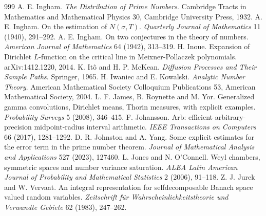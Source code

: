 \begin{thebibliography}{999}
 A. E. Ingham. \emph{The Distribution of Prime Numbers}. Cambridge Tracts in Mathematics and Mathematical Physics 30, Cambridge University Press, 1932.
 A. E. Ingham. On the estimation of $N(\sigma,T)$. \emph{Quarterly Journal of Mathematics} 11 (1940), 291--292.
 A. E. Ingham. On two conjectures in the theory of numbers. \emph{American Journal of Mathematics} 64 (1942), 313--319.
 H. Inoue. Expansion of Dirichlet $L$-function on the critical line in Meixner-Pollaczek polynomials. arXiv:1412.1220, 2014.
 K. It\^o and H. P. McKean. \emph{Diffusion Processes and Their Sample Paths}. Springer, 1965.
 H. Iwaniec and E. Kowalski. \emph{Analytic Number Theory}. American Mathematical Society Colloquium Publications 53, American Mathematical Society, 2004.
 L. F. James, B. Roynette and M. Yor. Generalized gamma convolutions, Dirichlet means, Thorin measures, with explicit examples. \emph{Probability Surveys} 5 (2008), 346--415.
 F. Johansson. Arb: efficient arbitrary-precision midpoint-radius interval arithmetic. \emph{IEEE Transactions on Computers} 66 (2017), 1281--1292.
 D. R. Johnston and A. Yang. Some explicit estimates for the error term in the prime number theorem. \emph{Journal of Mathematical Analysis and Applications} 527 (2023), 127460.
 L. Jones and N. O'Connell. Weyl chambers, symmetric spaces and number variance saturation. \emph{ALEA Latin American Journal of Probability and Mathematical Statistics} 2 (2006), 91--118.
 Z. J. Jurek and W. Vervaat. An integral representation for selfdecomposable Banach space valued random variables. \emph{Zeitschrift f\"ur Wahrscheinlichkeitstheorie und Verwandte Gebiete} 62 (1983), 247--262.

\end{thebibliography}
